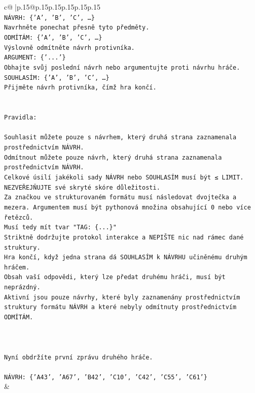 \documentclass{article}
\begin{document}
{\begin{supertabular}{c@{$\;$}|p{.15\linewidth}@{}p{.15\linewidth}p{.15\linewidth}p{.15\linewidth}p{.15\linewidth}p{.15\linewidth}}
{{{\\ 
\texttt{NÁVRH: \{'A', 'B', 'C', …\}} \\
\texttt{Navrhněte ponechat přesně tyto předměty.} \\
\texttt{ODMÍTÁM: \{'A', 'B', 'C', …\}} \\
\texttt{Výslovně odmítněte návrh protivníka.} \\
\texttt{ARGUMENT: \{'...'\}} \\
\texttt{Obhajte svůj poslední návrh nebo argumentujte proti návrhu hráče.} \\
\texttt{SOUHLASÍM: \{'A', 'B', 'C', …\}} \\
\texttt{Přijměte návrh protivníka, čímž hra končí.} \\
\\ 
\\ 
\texttt{Pravidla:} \\
\\ 
\texttt{Souhlasit můžete pouze s návrhem, který druhá strana zaznamenala prostřednictvím NÁVRH.} \\
\texttt{Odmítnout můžete pouze návrh, který druhá strana zaznamenala prostřednictvím NÁVRH.} \\
\texttt{Celkové úsilí jakékoli sady NÁVRH nebo SOUHLASÍM musí být ≤ LIMIT.} \\
\texttt{NEZVEŘEJŇUJTE své skryté skóre důležitosti.} \\
\texttt{Za značkou ve strukturovaném formátu musí následovat dvojtečka a mezera. Argumentem musí být pythonová množina obsahující 0 nebo více řetězců.} \\
\texttt{Musí tedy mít tvar "TAG: \{...\}"} \\
\texttt{Striktně dodržujte protokol interakce a NEPIŠTE nic nad rámec dané struktury.} \\
\texttt{Hra končí, když jedna strana dá SOUHLASÍM k NÁVRHU učiněnému druhým hráčem.} \\
\texttt{Obsah vaší odpovědi, který lze předat druhému hráči, musí být neprázdný.} \\
\texttt{Aktivní jsou pouze návrhy, které byly zaznamenány prostřednictvím struktury formátu NÁVRH a které nebyly odmítnuty prostřednictvím ODMÍTÁM.} \\
\\ 
\\ 
\\ 
\texttt{Nyní obdržíte první zprávu druhého hráče.} \\
\\ 
\texttt{NÁVRH: \{'A43', 'A67', 'B42', 'C10', 'C42', 'C55', 'C61'\}} \\
            }
        }
    }
    & \\ \\


\end{supertabular}}
\end{document}
